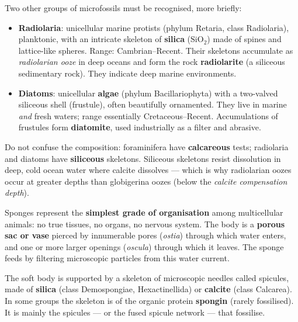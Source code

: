 \documentclass[11pt]{article}
\newcommand{\cle}[1]{{\popxbold\color{popdark}#1}}
\newcounter{popsec}
\newcounter{popsub}
\newcommand{\courssub}[1]{%
  \stepcounter{popsub}%
  \par\vspace{9pt}\noindent{\popxbold\fontsize{11.5}{13}\selectfont\color{popink}{\color{poporange}\thepopsec.\thepopsub}\hspace{6pt}#1}\par\nopagebreak\vspace{4pt}
}
\begin{document}
Two other groups of microfossils must be recognised, more briefly:

\begin{itemize}
\item \textbf{Radiolaria}: unicellular marine protists (phylum Retaria, class Radiolaria), planktonic, with an intricate skeleton of \textbf{silica} ($\mathrm{SiO_2}$) made of spines and lattice-like spheres. Range: Cambrian--Recent. Their skeletons accumulate as \emph{radiolarian ooze} in deep oceans and form the rock \textbf{radiolarite} (a siliceous sedimentary rock). They indicate deep marine environments.
\item \textbf{Diatoms}: unicellular \textbf{algae} (phylum Bacillariophyta) with a two-valved siliceous shell (frustule), often beautifully ornamented. They live in marine \emph{and} fresh waters; range essentially Cretaceous--Recent. Accumulations of frustules form \textbf{diatomite}, used industrially as a filter and abrasive.
\end{itemize}

\begin{attention}
Do not confuse the composition: foraminifera have \textbf{calcareous} tests; radiolaria and diatoms have \textbf{siliceous} skeletons. Siliceous skeletons resist dissolution in deep, cold ocean water where calcite dissolves --- which is why radiolarian oozes occur at greater depths than globigerina oozes (below the \emph{calcite compensation depth}).
\end{attention}

\courssub{Phylum Porifera: The Sponges}

Sponges represent the \textbf{simplest grade of organisation} among multicellular animals: no true tissues, no organs, no nervous system. The body is a \textbf{porous sac or vase} pierced by innumerable pores (\emph{ostia}) through which water enters, and one or more larger openings (\emph{oscula}) through which it leaves. The sponge feeds by filtering microscopic particles from this water current.

The soft body is supported by a skeleton of microscopic needles called \cle{spicules}, made of \textbf{silica} (class Demospongiae, Hexactinellida) or \textbf{calcite} (class Calcarea). In some groups the skeleton is of the organic protein \textbf{spongin} (rarely fossilised). It is mainly the spicules --- or the fused spicule network --- that fossilise.
\end{document}
